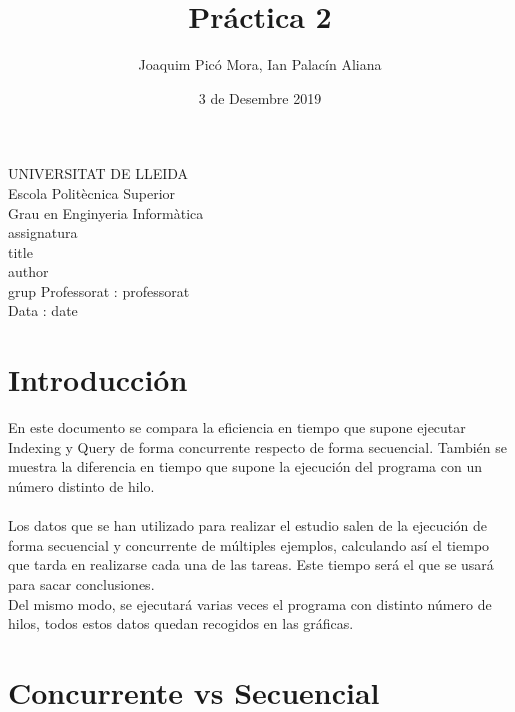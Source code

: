 \documentclass{article}
\title{Práctica 2}
\author{Joaquim Picó Mora, Ian Palacín Aliana}
\date{3 de Desembre 2019}
\renewcommand{\maketitle}{ %
	\begin{titlepage}
		\raggedright{UNIVERSITAT DE LLEIDA \\
			Escola Politècnica Superior \\
			Grau en Enginyeria Informàtica\\
			\1assignatura\\}
		\vspace{5cm}
		\centering\huge{\5title \\}
		\vspace{3cm}
		\large{\6author} \\
		\normalsize{\3grup}
		\vfill
		Professorat : \4professorat \\
		Data : \7date
\end{titlepage}}
\begin{document}
	\maketitle
	\thispagestyle{empty}
	
	\newpage
	\tableofcontents
	\newpage
	




\section{Introducción}

En este documento se compara la eficiencia en tiempo que supone ejecutar Indexing y 
Query de forma concurrente respecto de forma secuencial. 
También se muestra la diferencia en tiempo que 
supone la ejecución del programa con un número distinto de hilo.
\\\\
Los datos que se han utilizado para realizar el estudio salen de la ejecución 
de forma secuencial y concurrente de múltiples ejemplos, calculando así 
el tiempo que tarda en realizarse cada una de las tareas.
 Este tiempo será el que se usará para sacar conclusiones.\\
Del mismo modo, se ejecutará varias veces el programa con distinto número
 de hilos, todos estos datos quedan recogidos en las gráficas.

\section{Concurrente vs Secuencial}
\end{document}
